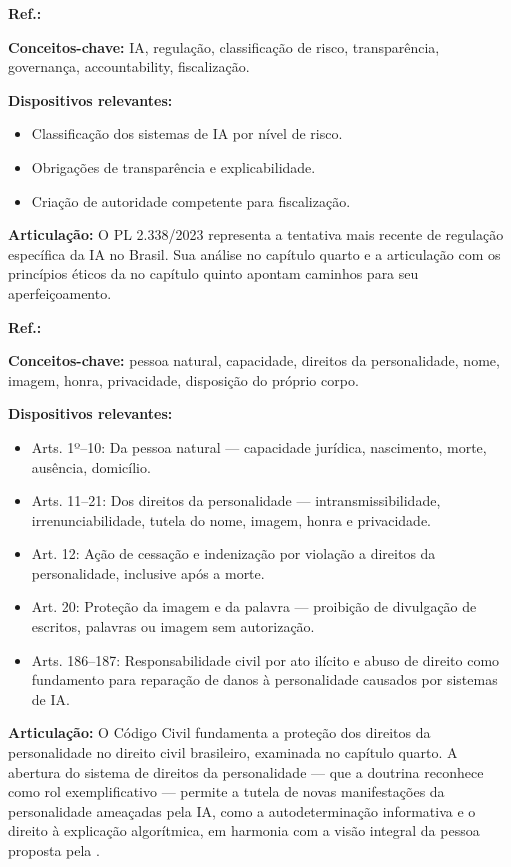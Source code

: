 \begin{fichamento}
    \textbf{Ref.:} \cite{Brasil2023PL2338}
    
    \textbf{Conceitos-chave:} IA, regulação, classificação de risco, transparência, governança, accountability, fiscalização.
    
    \textbf{Dispositivos relevantes:}
    \begin{itemize}
        \item Classificação dos sistemas de IA por nível de risco.
        \item Obrigações de transparência e explicabilidade.
        \item Criação de autoridade competente para fiscalização.
    \end{itemize}
    
    \textbf{Articulação:} O PL 2.338/2023 representa a tentativa mais recente de regulação específica da IA no Brasil. Sua análise no capítulo quarto e a articulação com os princípios éticos da \MH{} no capítulo quinto apontam caminhos para seu aperfeiçoamento.
\end{fichamento}

\begin{fichamento}
    \textbf{Ref.:} \cite{Brasil2002CC}
    
    \textbf{Conceitos-chave:} pessoa natural, capacidade, direitos da personalidade, nome, imagem, honra, privacidade, disposição do próprio corpo.
    
    \textbf{Dispositivos relevantes:}
    \begin{itemize}
        \item Arts. 1º–10: Da pessoa natural — capacidade jurídica, nascimento, morte, ausência, domicílio.
        \item Arts. 11–21: Dos direitos da personalidade — intransmissibilidade, irrenunciabilidade, tutela do nome, imagem, honra e privacidade.
        \item Art. 12: Ação de cessação e indenização por violação a direitos da personalidade, inclusive após a morte.
        \item Art. 20: Proteção da imagem e da palavra — proibição de divulgação de escritos, palavras ou imagem sem autorização.
        \item Arts. 186–187: Responsabilidade civil por ato ilícito e abuso de direito como fundamento para reparação de danos à personalidade causados por sistemas de IA.
    \end{itemize}
    
    \textbf{Articulação:} O Código Civil fundamenta a proteção dos direitos da personalidade no direito civil brasileiro, examinada no capítulo quarto. A abertura do sistema de direitos da personalidade — que a doutrina reconhece como rol exemplificativo — permite a tutela de novas manifestações da personalidade ameaçadas pela IA, como a autodeterminação informativa e o direito à explicação algorítmica, em harmonia com a visão integral da pessoa proposta pela \MH{}.
\end{fichamento}


